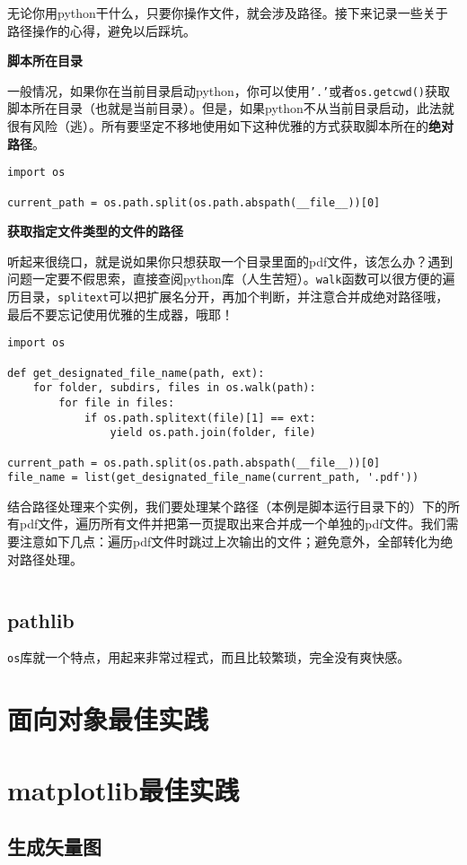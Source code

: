 无论你用python干什么，只要你操作文件，就会涉及路径。接下来记录一些关于路径操作的心得，避免以后踩坑。

\textbf{脚本所在目录}

一般情况，如果你在当前目录启动python，你可以使用\texttt{'.'}或者\texttt{os.getcwd()}获取脚本所在目录（也就是当前目录）。但是，如果python不从当前目录启动，此法就很有风险（逃）。所有要坚定不移地使用如下这种优雅的方式获取脚本所在的\textbf{绝对路径}。

\begin{verbatim}
import os

current_path = os.path.split(os.path.abspath(__file__))[0]
\end{verbatim}

\textbf{获取指定文件类型的文件的路径}

听起来很绕口，就是说如果你只想获取一个目录里面的pdf文件，该怎么办？遇到问题一定要不假思索，直接查阅python库（人生苦短）。\texttt{walk}函数可以很方便的遍历目录，\texttt{splitext}可以把扩展名分开，再加个判断，并注意合并成绝对路径哦，最后不要忘记使用优雅的生成器，哦耶！

\begin{verbatim}
import os

def get_designated_file_name(path, ext):
    for folder, subdirs, files in os.walk(path):
        for file in files:
            if os.path.splitext(file)[1] == ext:
                yield os.path.join(folder, file)

current_path = os.path.split(os.path.abspath(__file__))[0]
file_name = list(get_designated_file_name(current_path, '.pdf'))
\end{verbatim}

结合路径处理来个实例，我们要处理某个路径（本例是脚本运行目录下的）下的所有pdf文件，遍历所有文件并把第一页提取出来合并成一个单独的pdf文件。我们需要注意如下几点：遍历pdf文件时跳过上次输出的文件；避免意外，全部转化为绝对路径处理。

\inputminted{python}{code/python/treat_pdf.py}

\subsection{pathlib}

\texttt{os}库就一个特点，用起来非常过程式，而且比较繁琐，完全没有爽快感。

\section{面向对象最佳实践}

\section{matplotlib最佳实践}
\subsection{生成矢量图}


